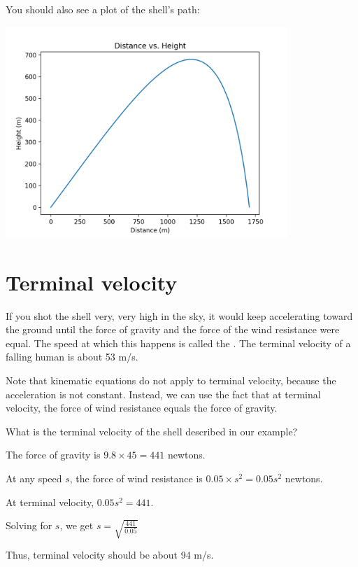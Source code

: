 You should also see a plot of the shell's path:

\includegraphics[width=0.8\textwidth]{artillery.png}

\section{Terminal velocity}
If you shot the shell very, very high in the sky, it would keep accelerating 
toward the ground until the force of gravity and the force of the wind resistance were equal.
The speed at which this happens is called the .  The terminal velocity of a
falling human is about 53 m/s.

Note that kinematic equations do not apply to terminal velocity, because the acceleration is not constant. Instead, we can use the fact that at terminal velocity, the force of wind resistance equals the force of gravity.
\begin{Exercise}[title={Terminal velocity}, label=terminal_velocity]
    What is the terminal velocity of the shell described in our example?
\end{Exercise}
\begin{Answer}[ref=terminal_velocity]
The force of gravity is $9.8 \times 45 = 441$ newtons.

At any speed $s$, the force of wind resistance is $0.05 \times s^2 = 0.05 s^2$ newtons.

At terminal velocity, $0.05 s^2 = 441$. 

Solving for $s$, we get $s = \sqrt{\frac{441}{0.05}}$

Thus, terminal velocity should be about 94 m/s.

\end{Answer}
